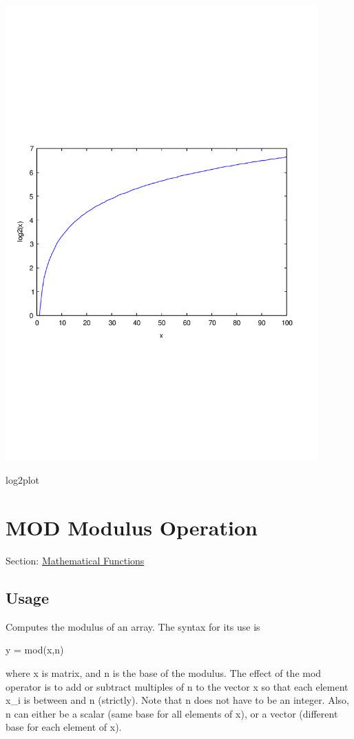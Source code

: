  
\begin{DoxyImage}
\includegraphics[width=12cm]{log2plot}
\caption{log2plot}
\end{DoxyImage}
 \hypertarget{mathfunctions_mod}{}\section{M\-O\-D Modulus Operation}\label{mathfunctions_mod}
Section\-: \hyperlink{sec_mathfunctions}{Mathematical Functions} \hypertarget{vtkwidgets_vtkxyplotwidget_Usage}{}\subsection{Usage}\label{vtkwidgets_vtkxyplotwidget_Usage}
Computes the modulus of an array. The syntax for its use is \begin{DoxyVerb}   y = mod(x,n)
\end{DoxyVerb}
 where {\ttfamily x} is matrix, and {\ttfamily n} is the base of the modulus. The effect of the {\ttfamily mod} operator is to add or subtract multiples of {\ttfamily n} to the vector {\ttfamily x} so that each element {\ttfamily x\-\_\-i} is between {} and {\ttfamily n} (strictly). Note that {\ttfamily n} does not have to be an integer. Also, {\ttfamily n} can either be a scalar (same base for all elements of {\ttfamily x}), or a vector (different base for each element of {\ttfamily x}).

